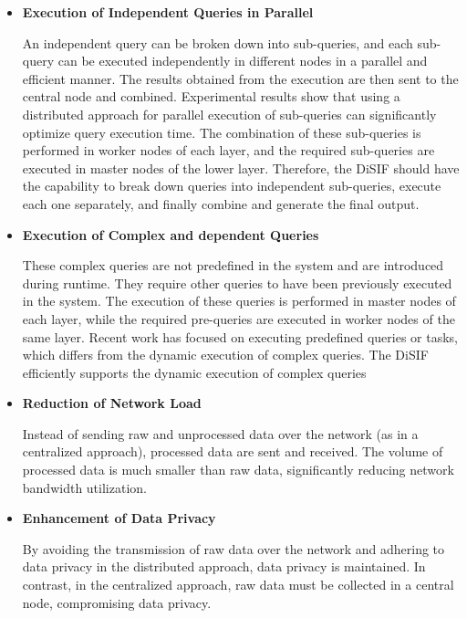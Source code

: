 \documentclass[5p,times]{elsarticle}
\begin{document}
\begin{itemize}

\item \textbf{Execution of Independent Queries in Parallel} 

An independent query can be broken down into sub-queries, and each sub-query
 can be executed independently in different nodes in a parallel and efficient manner. The results
  obtained from the execution are then sent to the central node and combined.
Experimental results show that using a distributed approach for parallel execution of sub-queries
 can significantly optimize query execution time. The combination of these sub-queries is performed in 
 worker nodes of each layer, and the required sub-queries are executed in master nodes of the lower layer.
Therefore, the DiSIF should have the capability to break down queries into independent sub-queries, 
execute each one separately, and finally combine and generate the final output.

\item \textbf{Execution of Complex and dependent Queries} 

These complex queries are not predefined in the system and are introduced during runtime. They require other queries to have been previously executed in the system. The execution of these queries is performed in master nodes of each layer, while the required pre-queries are executed in worker nodes of the same layer. Recent work has focused on executing predefined queries or tasks, which differs from the dynamic execution of complex queries. The DiSIF efficiently supports the dynamic execution of complex queries

\item \textbf{Reduction of Network Load} 

Instead of sending raw and unprocessed data over the network (as in a centralized approach), processed data are sent and received. The volume of processed data is much smaller than raw data, significantly reducing network bandwidth utilization.

\item \textbf{Enhancement of Data Privacy}

By avoiding the transmission of raw data over the network and adhering to data privacy in the distributed approach, data privacy is maintained. In contrast, in the centralized approach, raw data must be collected in a central node, compromising data privacy.

\end{itemize}
\end{document}
